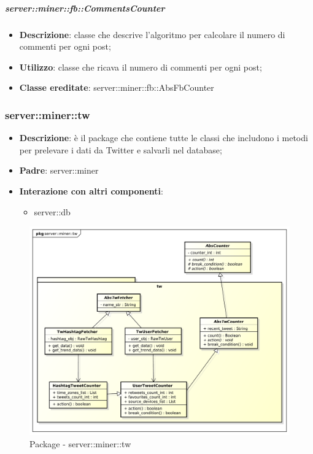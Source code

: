 	\subparagraph{server::miner::fb::CommentsCounter} %
		\label{subp:server_miner_fb_CommentsCounter}
			\begin{itemize}
				\item \textbf{Descrizione}: classe che descrive l'algoritmo per calcolare il numero di commenti per ogni post;
				\item \textbf{Utilizzo}: classe che ricava il numero di commenti per ogni post;
				\item \textbf{Classe ereditate}: server::miner::fb::AbsFbCounter
			\end{itemize}

\subsubsection{server::miner::tw} %
\label{ssub:bdsm_app_server_miner_tw}

\begin{itemize}
  \item \textbf{Descrizione}: è il package che contiene tutte le classi che includono i metodi per prelevare i dati da Twitter e salvarli nel database;
  \item \textbf{Padre}: server::miner
  \item \textbf{Interazione con altri componenti}:
  	\begin{itemize}
  		\item server::db
  	\end{itemize}
\end{itemize}

	\begin{figure}[!htbp]
		\centering
		\centerline{\includegraphics[scale=0.5]{./images/server/miner_tw.pdf}}
		\caption{Package - server::miner::tw}
	\end{figure}

